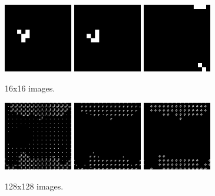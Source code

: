 \documentclass{article}
\begin{document}
\begin{multicols}{2}

\begin{figure}[H]
\centering
\includegraphics[width=3cm]{pngimages/16-1.png}
\includegraphics[width=3cm]{pngimages/16-2.png}
\includegraphics[width=3cm]{pngimages/16-100.png}
\caption{16x16 images.}
\end{figure}

\begin{figure}[H]
\centering
\includegraphics[width=3cm]{pngimages/128-1.png}
\includegraphics[width=3cm]{pngimages/128-2.png}
\includegraphics[width=3cm]{pngimages/128-100.png}
\caption{128x128 images.}
\end{figure}


\end{multicols}
\end{document}
